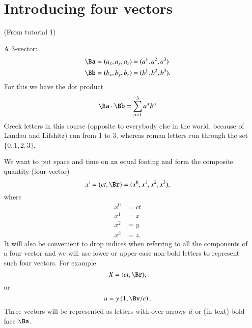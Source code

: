 %
%
\section{Introducing four vectors}

(From tutorial 1)

A 3-vector:
%
\begin{equation}\label{eqn:relativisticElectrodynamicsT1:10}
\begin{aligned}
\Ba &= (a_x, a_y, a_z) = (a^1, a^2, a^3) \\
\Bb &= (b_x, b_y, b_z) = (b^1, b^2, b^3).
\end{aligned}
\end{equation}
%
For this we have the dot product
\begin{equation}\label{eqn:relativisticElectrodynamicsT1:20}
\Ba \cdot \Bb = \sum_{\alpha=1}^3 a^\alpha b^\alpha
\end{equation}
%
Greek letters in this course (opposite to everybody else in the world, because of Landau and Lifshitz) run from 1 to 3, whereas roman letters run through the set \(\{0,1,2,3\}\).

We want to put space and time on an equal footing and form the composite quantity (four vector)
\begin{equation}\label{eqn:relativisticElectrodynamicsT1:40}
x^i = (ct, \Br) = (x^0, x^1, x^2, x^3),
\end{equation}
where
\begin{equation}\label{eqn:relativisticElectrodynamicsT1:80}
\begin{aligned}
x^0 &= ct \\
x^1 &= x \\
x^2 &= y \\
x^3 &= z.
\end{aligned}
\end{equation}
%
It will also be convenient to drop indices when referring to all the components of a four vector and we will use lower or upper case non-bold letters to represent such four vectors.  For example
%
\begin{equation}\label{eqn:relativisticElectrodynamicsT1:81}
X = (ct, \Br),
\end{equation}
or
\begin{equation}\label{eqn:relativisticElectrodynamicsT1:82}
u = \gamma \left(1, \Bv/c \right).
\end{equation}
%
Three vectors will be represented as letters with over arrows \(\vec{a}\) or (in text) bold face \(\Ba\).

